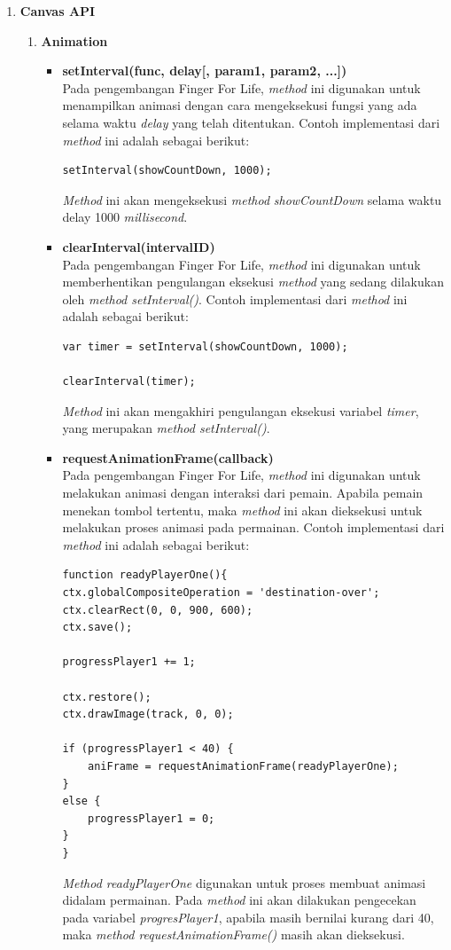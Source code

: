 \begin{enumerate}
	\item \textbf{Canvas API}
	\begin{enumerate}
		\item \textbf{Animation}
		\begin{itemize}
			\item \textbf{setInterval(func, delay[, param1, param2, ...])} \\
			Pada pengembangan Finger For Life, \textit{method} ini digunakan untuk menampilkan animasi dengan cara mengeksekusi fungsi yang ada selama waktu \textit{delay} yang telah ditentukan. Contoh implementasi dari \textit{method} ini adalah sebagai berikut:
\begin{lstlisting}
setInterval(showCountDown, 1000);
\end{lstlisting}
\textit{Method} ini akan mengeksekusi \textit{method} \textit{showCountDown} selama waktu delay 1000 \textit{millisecond}.
			
			\item \textbf{clearInterval(intervalID)} \\
			Pada pengembangan Finger For Life, \textit{method} ini digunakan untuk memberhentikan pengulangan eksekusi \textit{method} yang sedang dilakukan oleh \textit{method setInterval()}. Contoh implementasi dari \textit{method} ini adalah sebagai berikut:
\begin{lstlisting}
var timer = setInterval(showCountDown, 1000);

clearInterval(timer);
\end{lstlisting}
			\textit{Method} ini akan mengakhiri pengulangan eksekusi variabel \textit{timer}, yang merupakan \textit{method setInterval()}.			
			
			\item \textbf{requestAnimationFrame(callback)} \\
			Pada pengembangan Finger For Life, \textit{method} ini digunakan untuk melakukan animasi dengan interaksi dari pemain. Apabila pemain menekan tombol tertentu, maka \textit{method} ini akan dieksekusi untuk melakukan proses animasi pada permainan. Contoh implementasi dari \textit{method} ini adalah sebagai berikut:
\begin{lstlisting}
function readyPlayerOne(){
ctx.globalCompositeOperation = 'destination-over';
ctx.clearRect(0, 0, 900, 600);
ctx.save();

progressPlayer1 += 1;

ctx.restore();
ctx.drawImage(track, 0, 0);

if (progressPlayer1 < 40) {
	aniFrame = requestAnimationFrame(readyPlayerOne);
}
else {
	progressPlayer1 = 0;
}
}
\end{lstlisting}
\textit{Method readyPlayerOne} digunakan untuk proses membuat animasi didalam permainan. Pada \textit{method} ini akan dilakukan pengecekan pada variabel \textit{progresPlayer1}, apabila masih bernilai kurang dari 40, maka \textit{method requestAnimationFrame()} masih akan dieksekusi.
		\end{itemize}
		

\end{enumerate}
\end{enumerate}
